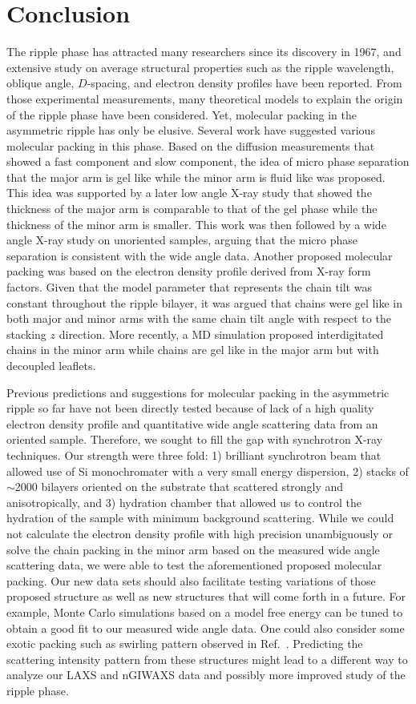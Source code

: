 \section{Conclusion}\label{sec:ripple_conclusion}
The ripple phase has attracted many researchers since its discovery in 1967,
and extensive study on average structural properties such as 
the ripple wavelength, oblique angle, $D$-spacing, and electron density
profiles have been reported. From those experimental measurements, 
many theoretical models to explain the origin of the ripple phase have 
been considered. Yet, molecular packing in the asymmetric
ripple has only be elusive. 
Several work have suggested various molecular packing in this phase.
Based on the diffusion measurements that showed a fast component and
slow component, the idea of micro phase separation that the major arm
is gel like while the minor arm is fluid like was proposed. This idea
was supported by a later low angle X-ray study that showed the thickness of the major arm
is comparable to that of the gel phase while the thickness of the minor
arm is smaller. This work was then followed by a wide angle X-ray study on
unoriented samples, arguing that the micro phase separation is consistent 
with the wide angle data.
Another proposed molecular packing was based on the electron density profile
derived from X-ray form factors. Given that the model parameter that represents
the chain tilt was constant throughout the ripple bilayer, it was argued 
that chains were gel like in both major and minor arms with the same 
chain tilt angle with respect to the stacking $z$ direction.
More recently, a MD simulation proposed interdigitated chains in the minor 
arm while chains are gel like in the major arm but with decoupled leaflets.

Previous predictions and suggestions for molecular packing in the asymmetric
ripple so far have not been directly tested 
because of lack of a high quality electron
density profile and quantitative wide angle 
scattering data from an oriented sample.
Therefore, we sought to fill the gap
with synchrotron X-ray techniques. Our strength were three fold: 1) brilliant
synchrotron beam that allowed use of Si monochromater with a very small
energy dispersion, 2) stacks of $\sim$2000 bilayers oriented on the substrate
that scattered strongly and anisotropically, and 3) hydration chamber that 
allowed us to control the hydration of the sample with minimum background scattering.
While we could not calculate the electron density profile with high precision unambiguously
or solve the chain packing in the minor arm based on the measured wide angle scattering data, 
we were able to test the aforementioned proposed molecular packing.
Our new data sets should also facilitate testing variations of those proposed 
structure as well as new structures that will come forth in a future.
For example, Monte Carlo simulations based on a model free energy can be tuned
to obtain a good fit to our measured wide angle data.
One could also consider some exotic packing such as swirling pattern observed
in Ref.~\cite{ref:Watkins11}. Predicting the scattering
intensity pattern from these structures might lead to a different way
to analyze our LAXS and nGIWAXS data and possibly more improved study of the 
ripple phase. 

